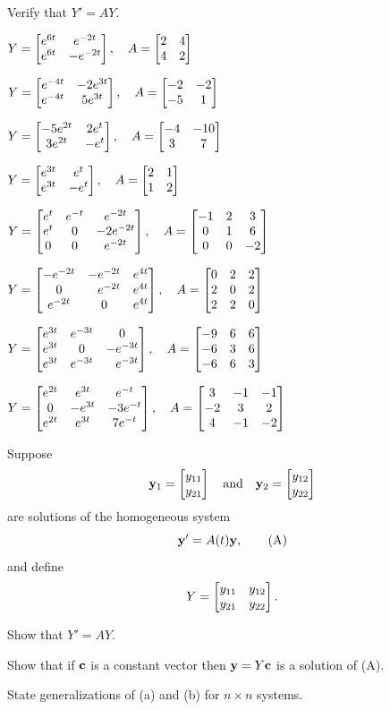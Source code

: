 \begin{exerciselist}
\item\label{exer:10.2.8}Verify that $Y' = AY$.

\begin{alist}
\item  %
 $Y = \begin{bmatrix}e^{6t}&e^{-2t}\\e^{6t}&-e^{-2t}\end{bmatrix}, \quad A = \begin{bmatrix}2&4\\4&2\end{bmatrix}$

\item %
 $Y = \begin{bmatrix}e^{-4t}&-2e^{3t}\\e^{-4t}&5e^{3t}\end{bmatrix}, \quad A = \begin{bmatrix}-2&-2\\-5&1\end{bmatrix}$

\item %
 $Y  = \begin{bmatrix}-5e^{2t}&2e^t\\3e^{2t}&-e^t\end{bmatrix}, \quad A =
\begin{bmatrix}-4&-10\\3&7\end{bmatrix}$

\item %
 $Y = \begin{bmatrix}e^{3t}&e^t\\e^{3t}&-e^t\end{bmatrix}, \quad A = \begin{bmatrix}2&1\\1&2\end{bmatrix}$

\item %
$Y = \begin{bmatrix}
e^t&e^{-t}&e^{-2t}\\
e^t&0&-2e^{-2t}\\
0&0&e^{-2t}\end{bmatrix}, \quad
A = \begin{bmatrix}-1&2&3\\0&1&6\\0&0&-2\end{bmatrix}$

\item %
$Y = \begin{bmatrix}-e^{-2t}&-e^{-2t}&e^{4t}\\0&\phantom{-} e^{-2t}&e^{4t}\\e^{-2t}&0&e^{4t}\end{bmatrix}, \quad A =
\begin{bmatrix}0&2&2\\2&0&2\\2&2&0\end{bmatrix}$

\item %
 $Y = \begin{bmatrix}e^{3t}&e^{-3t}&0\\e^{3t}&0&-e^{-3t}\\e^{3t}&e^{-3t}&\phantom{-}e^{-3t}\end{bmatrix}, \quad A = \begin{bmatrix}-9&6&6\\-6&3&6\\-6&6&3\end{bmatrix}$

\item %
$Y = \begin{bmatrix}
e^{2t}&e^{3t}&e^{-t}\\
0&-e^{3t}&-3e^{-t}\\
e^{2t}&e^{3t}&7e^{-t}
\end{bmatrix},
\quad A =
\begin{bmatrix}3&-1&-1\\-2&3&2\\4&-1&-2\end{bmatrix}$

\end{alist}

\item\label{exer:10.2.9}Suppose
\[
\mathbf{y}_1=\begin{bmatrix}y_{11}\\y_{21}\end{bmatrix}\quad\text{and}\quad \mathbf{y}_2=\begin{bmatrix}y_{12}\\y_{22}\end{bmatrix}\] are solutions of the homogeneous system
\[
\mathbf{y}'=A(t)\mathbf{y},
\tag{A}
\]
and define
\[Y=
\begin{bmatrix}y_{11}&y_{12}\\y_{21}&y_{22}\end{bmatrix}.
\]
\begin{alist}
\item %
 Show that $Y'=AY$.
\item %
 Show that if $\mathbf{c}$ is a constant vector then $\mathbf{y}=
Y\mathbf{c}$
 is a solution of  (A).
\item %
 State generalizations of  (a) and (b) for $n\times n$
systems.
\end{alist}


\end{exerciselist}
